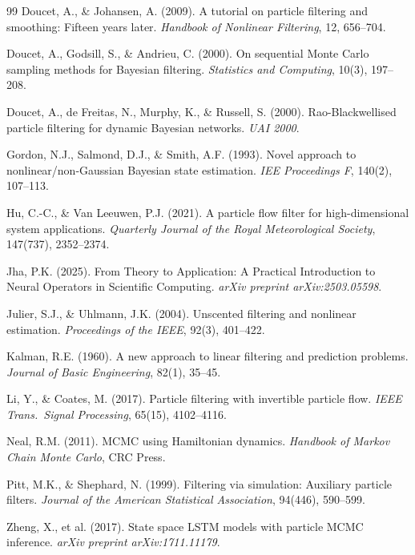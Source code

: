 \documentclass[12pt,a4paper]{article}
\theoremstyle{definition}
\theoremstyle{remark}
\begin{document}
\begin{thebibliography}{99}
Doucet, A., \& Johansen, A. (2009).
A tutorial on particle filtering and smoothing: Fifteen years later.
\textit{Handbook of Nonlinear Filtering}, 12, 656--704.

Doucet, A., Godsill, S., \& Andrieu, C. (2000).
On sequential Monte Carlo sampling methods for Bayesian filtering.
\textit{Statistics and Computing}, 10(3), 197--208.

Doucet, A., de Freitas, N., Murphy, K., \& Russell, S. (2000).
Rao-Blackwellised particle filtering for dynamic Bayesian networks.
\textit{UAI 2000}.

Gordon, N.J., Salmond, D.J., \& Smith, A.F. (1993).
Novel approach to nonlinear/non-Gaussian Bayesian state estimation.
\textit{IEE Proceedings F}, 140(2), 107--113.

Hu, C.-C., \& Van Leeuwen, P.J. (2021).
A particle flow filter for high-dimensional system applications.
\textit{Quarterly Journal of the Royal Meteorological Society}, 147(737), 2352--2374.

Jha, P.K. (2025).
From Theory to Application: A Practical Introduction to Neural Operators in Scientific Computing.
\textit{arXiv preprint arXiv:2503.05598}.

Julier, S.J., \& Uhlmann, J.K. (2004).
Unscented filtering and nonlinear estimation.
\textit{Proceedings of the IEEE}, 92(3), 401--422.

Kalman, R.E. (1960).
A new approach to linear filtering and prediction problems.
\textit{Journal of Basic Engineering}, 82(1), 35--45.

Li, Y., \& Coates, M. (2017).
Particle filtering with invertible particle flow.
\textit{IEEE Trans.\ Signal Processing}, 65(15), 4102--4116.

Neal, R.M. (2011).
MCMC using Hamiltonian dynamics.
\textit{Handbook of Markov Chain Monte Carlo}, CRC Press.

Pitt, M.K., \& Shephard, N. (1999).
Filtering via simulation: Auxiliary particle filters.
\textit{Journal of the American Statistical Association}, 94(446), 590--599.

Zheng, X., et al. (2017).
State space LSTM models with particle MCMC inference.
\textit{arXiv preprint arXiv:1711.11179}.

\end{thebibliography}
\end{document}
